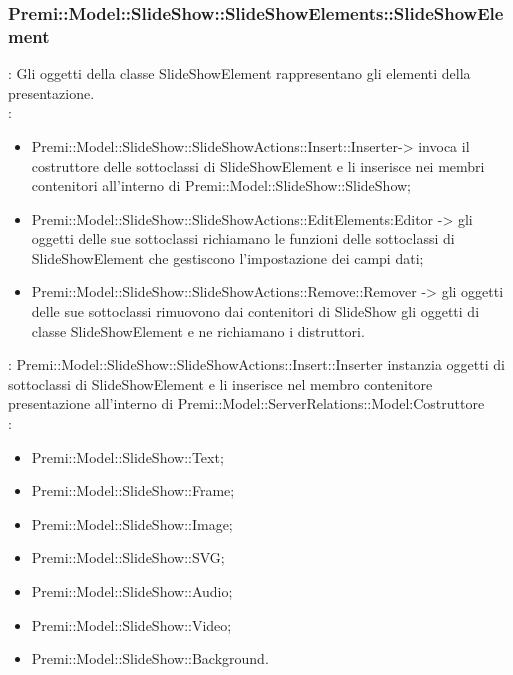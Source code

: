 {    \subsubsection{Premi::Model::SlideShow::SlideShowElements::SlideShowElement}{
				\textbf{\tipo}: Gli oggetti della classe SlideShowElement rappresentano gli elementi della presentazione.\\	
				\textbf{\relaz}: 
				\begin{itemize}
					\item Premi::Model::SlideShow::SlideShowActions::Insert::Inserter-> invoca il costruttore delle sottoclassi di SlideShowElement e li inserisce nei membri contenitori all’interno di Premi::Model::SlideShow::SlideShow;
                    \item Premi::Model::SlideShow::SlideShowActions::EditElements:Editor -> gli oggetti delle sue sottoclassi richiamano le funzioni delle sottoclassi di SlideShowElement che gestiscono l’impostazione dei campi dati;
                    \item Premi::Model::SlideShow::SlideShowActions::Remove::Remover -> gli oggetti delle sue sottoclassi rimuovono dai contenitori di SlideShow gli oggetti di classe SlideShowElement e ne richiamano i distruttori.
				\end{itemize}	
                \textbf{\interfacce}: Premi::Model::SlideShow::SlideShowActions::Insert::Inserter instanzia oggetti di sottoclassi di SlideShowElement e li inserisce nel membro contenitore presentazione all’interno di Premi::Model::ServerRelations::Model:Costruttore\\
                \textbf{\figli}: 
                    \begin{itemize}
                    \item Premi::Model::SlideShow::Text;
                    \item Premi::Model::SlideShow::Frame;
                    \item Premi::Model::SlideShow::Image;
                    \item Premi::Model::SlideShow::SVG;
                    \item Premi::Model::SlideShow::Audio;
                    \item Premi::Model::SlideShow::Video;
                    \item Premi::Model::SlideShow::Background.
                    \end{itemize}
                    }
}
